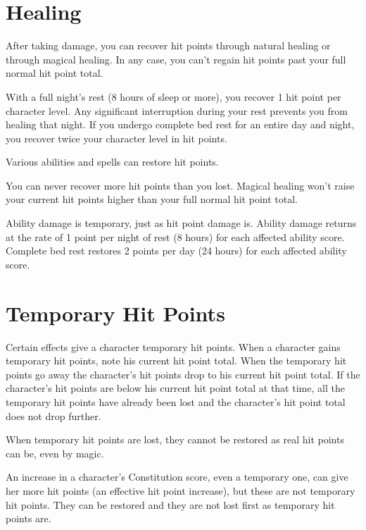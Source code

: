 \section{Healing}

After taking damage, you can recover hit points through natural healing or through magical healing. In any case, you can't regain hit points past your full normal hit point total.

\vspace*{10pt}

With a full night's rest (8 hours of sleep or more), you recover 1 hit point per character level. Any significant interruption during your rest prevents you from healing that night. If you undergo complete bed rest for an entire day and night, you recover twice your character level in hit points. 

Various abilities and spells can restore hit points.

You can never recover more hit points than you lost. Magical healing won't raise your current hit points higher than your full normal hit point total.

Ability damage is temporary, just as hit point damage is. Ability damage returns at the rate of 1 point per night of rest (8 hours) for each affected ability score. Complete bed rest restores 2 points per day (24 hours) for each affected ability score.

\section{Temporary Hit Points}

Certain effects give a character temporary hit points. When a character gains temporary hit points, note his current hit point total. When the temporary hit points go away the character's hit points drop to his current hit point total. If the character's hit points are below his current hit point total at that time, all the temporary hit points have already been lost and the character's hit point total does not drop further.

When temporary hit points are lost, they cannot be restored as real hit points can be, even by magic.

\vspace*{10pt}

An increase in a character's Constitution score, even a temporary one, can give her more hit points (an effective hit point increase), but these are not temporary hit points. They can be restored and they are not lost first as temporary hit points are.

